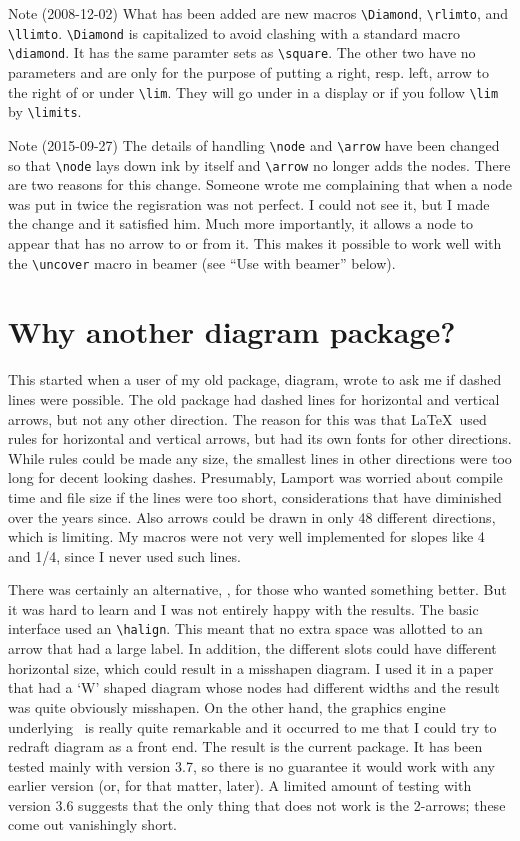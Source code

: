 \documentclass[12pt]{article}
\begin{document}
Note (2008-12-02) What has been added are new macros \verb+\Diamond+,
\verb+\rlimto+, and \verb+\llimto+.  \verb+\Diamond+ is capitalized to
avoid clashing with a standard macro \verb+\diamond+.  It has the same
paramter sets as \verb+\square+.  The other two have no parameters and
are only for the purpose of putting a right, resp. left, arrow to the
right of or under \verb+\lim+.  They will go under in a display or if
you follow \verb+\lim+ by \verb+\limits+.

Note (2015-09-27) The details of handling \verb.\node. and \verb.\arrow.
have been changed so that \verb.\node. lays down ink by itself and
\verb.\arrow. no longer adds the nodes.  There are two reasons for this
change.  Someone wrote me complaining that when a node was put in twice
the regisration was not perfect.  I could not see it, but I made the
change and it satisfied him.  Much more importantly, it allows a node to
appear that has no arrow to or from it.  This makes it possible to work
well with the \verb.\uncover. macro in beamer (see ``Use with beamer''
below).

\section{Why another diagram package?}

This started when a user of my old package, diagram, wrote to ask me if
dashed lines were possible.  The old package had dashed lines for
horizontal and vertical arrows, but not any other direction.  The reason
for this was that \LaTeX\ used rules for horizontal and vertical arrows,
but had its own fonts for other directions.  While rules could be made
any size, the smallest lines in other directions were too long for
decent looking dashes.  Presumably, Lamport was worried about compile
time and file size if the lines were too short, considerations that have
diminished over the years since.  Also arrows could be drawn in only 48
different directions, which is limiting.  My macros were not very well
implemented for slopes like 4 and 1/4, since I never used such lines.

There was certainly an alternative, \xypic, for those who wanted
something better.  But it was hard to learn and I was not entirely happy
with the results.  The basic interface used an
\verb.\halign..  This
meant that no extra space was allotted to an arrow that had a large
label.  In addition, the different slots could have different horizontal
size, which could result in a misshapen diagram.  I used it in a paper
that had a `W' shaped diagram whose nodes had different widths and the
result was quite obviously misshapen.  On the other hand, the graphics
engine underlying \xypic\ is really quite remarkable and it occurred to
me that I could try to redraft diagram as a front end.  The result is
the current package.  It has been tested mainly with version 3.7, so
there is no guarantee it would work with any earlier version (or, for
that matter, later).  A limited amount of testing with version 3.6
suggests that the only thing that does not work is the 2-arrows; these
come out vanishingly short.
\end{document}
